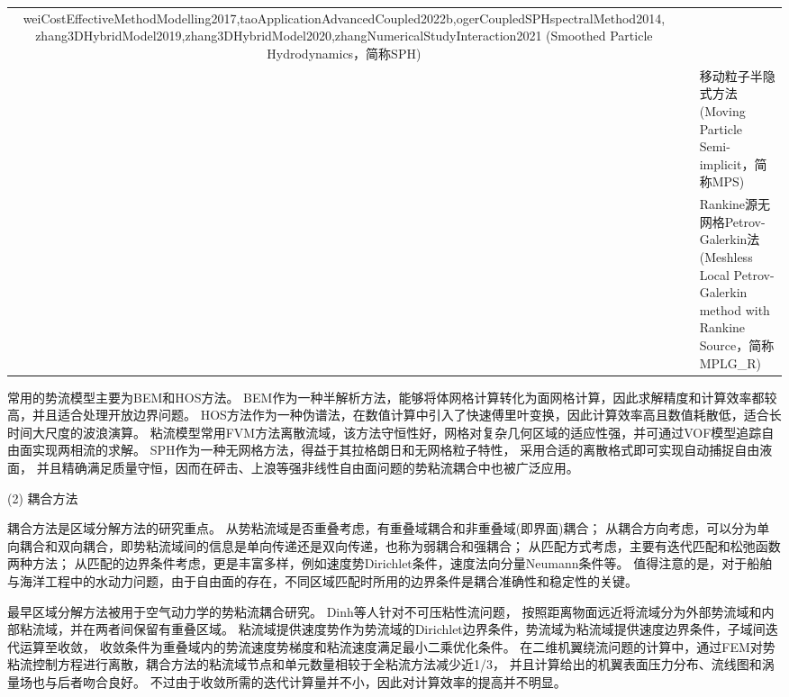 \begin{mytable}
\begin{tabularx}{\textwidth}{c|c|X}
{{		weiCostEffectiveMethodModelling2017,taoApplicationAdvancedCoupled2022b,ogerCoupledSPHspectralMethod2014,%
		zhang3DHybridModel2019,zhang3DHybridModel2020,zhangNumericalStudyInteraction2021} (Smoothed Particle Hydrodynamics，简称SPH)} \\
		& & {移动粒子半隐式方法\cite{sunWeakCouplingMPS2017} (Moving Particle Semi-implicit，简称MPS)} \\
		& & {Rankine源无网格Petrov-Galerkin法\cite{agarwalThreedimensionalCouplingBoussinesq2022,sriramHybridMethodModelling2014,%
		kumarHybridNumericalModel2020} (Meshless Local Petrov-Galerkin method with Rankine Source，简称MPLG\_R)} \\
		\bottomrule
	\end{tabularx}
\end{mytable}

常用的势流模型主要为BEM和HOS方法。%
BEM作为一种半解析方法，能够将体网格计算转化为面网格计算，因此求解精度和计算效率都较高，并且适合处理开放边界问题。%
HOS方法作为一种伪谱法，在数值计算中引入了快速傅里叶变换，因此计算效率高且数值耗散低，适合长时间大尺度的波浪演算。%
粘流模型常用FVM方法离散流域，该方法守恒性好，网格对复杂几何区域的适应性强，并可通过VOF模型追踪自由面实现两相流的求解。%
SPH作为一种无网格方法，得益于其拉格朗日和无网格粒子特性，%
采用合适的离散格式即可实现自动捕捉自由液面\cite{colagrossiTheoreticalConsiderationsFreesurface2009}，%
并且精确满足质量守恒，因而在砰击、上浪等强非线性自由面问题的势粘流耦合中也被广泛应用。%

(2) 耦合方法%

耦合方法是区域分解方法的研究重点。%
从势粘流域是否重叠考虑，有重叠域耦合和非重叠域(即界面)耦合；%
从耦合方向考虑，可以分为单向耦合和双向耦合，即势粘流域间的信息是单向传递还是双向传递，也称为弱耦合和强耦合；%
从匹配方式考虑，主要有迭代匹配和松弛函数两种方法；%
从匹配的边界条件考虑，更是丰富多样，例如速度势Dirichlet条件，速度法向分量Neumann条件等。%
值得注意的是，对于船舶与海洋工程中的水动力问题，由于自由面的存在，不同区域匹配时所用的边界条件是耦合准确性和稳定性的关键。%

最早区域分解方法被用于空气动力学的势粘流耦合研究。%
Dinh等人\cite{glowinskiDomainDecompositionMethods1983,dinhCouplingViscousInviscid1988}针对不可压粘性流问题，%
按照距离物面远近将流域分为外部势流域和内部粘流域，并在两者间保留有重叠区域。%
粘流域提供速度势作为势流域的Dirichlet边界条件，势流域为粘流域提供速度边界条件，子域间迭代运算至收敛，%
收敛条件为重叠域内的势流速度势梯度和粘流速度满足最小二乘优化条件。%
在二维机翼绕流问题的计算中，通过FEM对势粘流控制方程进行离散，耦合方法的粘流域节点和单元数量相较于全粘流方法减少近1/3，%
并且计算给出的机翼表面压力分布、流线图和涡量场也与后者吻合良好。%
不过由于收敛所需的迭代计算量并不小，因此对计算效率的提高并不明显。%

